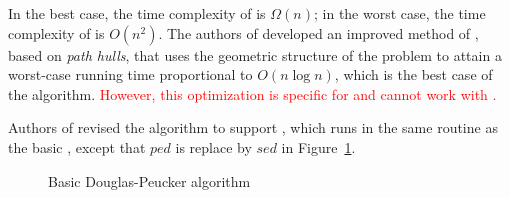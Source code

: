 In the best case, the time complexity of \dpa is $\Omega(n)$; in the worst case, the time complexity of \dpa is $O(n^2)$.
The authors of \cite{Hershberger:Speeding} developed an improved method of \dpa, based on \emph{path hulls}, that uses the geometric structure of the problem to attain a worst-case running time proportional to $O(n\log n)$, which is the best case of the \dpa algorithm. \textcolor{red}{However, this optimization is specific for \ped  and cannot work with \sed.}

Authors of \cite{Meratnia:Spatiotemporal} revised the \dpa algorithm to support \sed, which runs in the same routine as the basic \dpa, except that $ped$ is replace by $sed$ in Figure~\ref{alg:dp}.



\begin{figure}[tb!]
\begin{center}
{\small
\begin{minipage}{3.3in}
\myhrule \vspace{-1ex}
\vspace{-2.5ex}
\myhrule
\end{minipage}
}
\end{center}
\vspace{-3ex}
\caption{\small Basic Douglas-Peucker algorithm}
\label{alg:dp}
\vspace{-2ex}
\end{figure}


